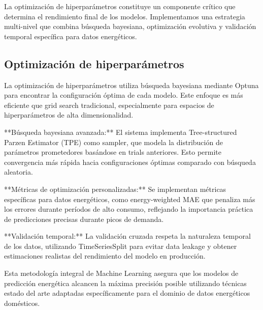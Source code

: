 La optimización de hiperparámetros constituye un componente crítico que determina el rendimiento final de los modelos. Implementamos una estrategia multi-nivel que combina búsqueda bayesiana, optimización evolutiva y validación temporal específica para datos energéticos.

\subsection{Optimización de hiperparámetros}

La optimización de hiperparámetros utiliza búsqueda bayesiana mediante Optuna para encontrar la configuración óptima de cada modelo. Este enfoque es más eficiente que grid search tradicional, especialmente para espacios de hiperparámetros de alta dimensionalidad.

**Búsqueda bayesiana avanzada:** El sistema implementa Tree-structured Parzen Estimator (TPE) como sampler, que modela la distribución de parámetros prometedores basándose en trials anteriores. Esto permite convergencia más rápida hacia configuraciones óptimas comparado con búsqueda aleatoria.

**Métricas de optimización personalizadas:** Se implementan métricas específicas para datos energéticos, como energy-weighted MAE que penaliza más los errores durante períodos de alto consumo, reflejando la importancia práctica de predicciones precisas durante picos de demanda.

**Validación temporal:** La validación cruzada respeta la naturaleza temporal de los datos, utilizando TimeSeriesSplit para evitar data leakage y obtener estimaciones realistas del rendimiento del modelo en producción.

Esta metodología integral de Machine Learning asegura que los modelos de predicción energética alcancen la máxima precisión posible utilizando técnicas estado del arte adaptadas específicamente para el dominio de datos energéticos domésticos.
